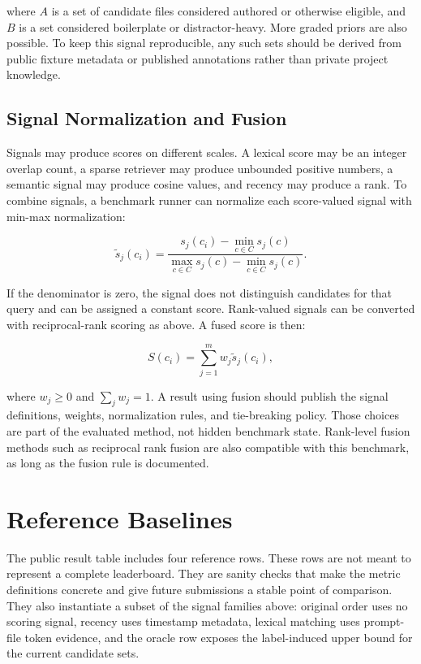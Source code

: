 \documentclass[11pt,a4paper]{article}
\begin{document}
where $A$ is a set of candidate files considered authored or otherwise eligible,
and $B$ is a set considered boilerplate or distractor-heavy. More graded priors
are also possible. To keep this signal reproducible, any such sets should be
derived from public fixture metadata or published annotations rather than
private project knowledge.

\subsection{Signal Normalization and Fusion}

Signals may produce scores on different scales. A lexical score may be an
integer overlap count, a sparse retriever may produce unbounded positive
numbers, a semantic signal may produce cosine values, and recency may produce a
rank. To combine signals, a benchmark runner can normalize each score-valued
signal with min-max normalization:

\[
\tilde{s}_j(c_i) =
\frac{s_j(c_i) - \min_{c \in C} s_j(c)}
{\max_{c \in C} s_j(c) - \min_{c \in C} s_j(c)}.
\]

If the denominator is zero, the signal does not distinguish candidates for that
query and can be assigned a constant score. Rank-valued signals can be converted
with reciprocal-rank scoring as above. A fused score is then:

\[
S(c_i) = \sum_{j=1}^{m} w_j \tilde{s}_j(c_i),
\]

where $w_j \geq 0$ and $\sum_j w_j = 1$. A result using fusion should publish
the signal definitions, weights, normalization rules, and tie-breaking policy.
Those choices are part of the evaluated method, not hidden benchmark state.
Rank-level fusion methods such as reciprocal rank fusion
\cite{cormack2009reciprocal} are also compatible with this benchmark, as long as
the fusion rule is documented.

\section{Reference Baselines}

The public result table includes four reference rows. These rows are not meant
to represent a complete leaderboard. They are sanity checks that make the metric
definitions concrete and give future submissions a stable point of comparison.
They also instantiate a subset of the signal families above: original order
uses no scoring signal, recency uses timestamp metadata, lexical matching uses
prompt-file token evidence, and the oracle row exposes the label-induced upper
bound for the current candidate sets.
\end{document}

